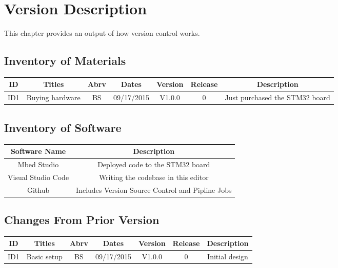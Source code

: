 
\chapter{Version Description}
\label{loc:VersionDescription}
% 
This chapter provides an output of how version control works.

\section{Inventory of Materials}
\label{loc:InventoryOfMaterials}
% 
\begin{center}
\begin{tabular}{|| c c c c c c c ||}
\hline
 ID & Titles & Abrv & Dates & Version & Release & Description\\
\hline 
\hline
 ID1 & Buying hardware & BS & 09/17/2015 &  V1.0.0 & 0 & Just purchased the STM32 board\\ 
\hline
\end{tabular}
\end{center}

\section{Inventory of Software}
\label{loc:InventoryOfSoftware}
% 
\begin{center}
\begin{tabular}{|| c c ||}
\hline
 Software Name & Description \\
\hline 
\hline
 Mbed Studio & Deployed code to the STM32 board\\
 Visual Studio Code & Writing the codebase in this editor \\
 Github & Includes Version Source Control and Pipline Jobs \\
\hline
\end{tabular}
\end{center}

\section{Changes From Prior Version}
\label{loc:ChangesFromPriorVersion}
% 

\begin{center}
\begin{tabular}{|| c c c c c c c ||}
\hline
 ID & Titles & Abrv & Dates & Version & Release & Description\\
\hline 
\hline
 ID1 & Basic setup & BS & 09/17/2015 &  V1.0.0 & 0 & Initial design\\ 
\hline
\end{tabular}
\end{center}

